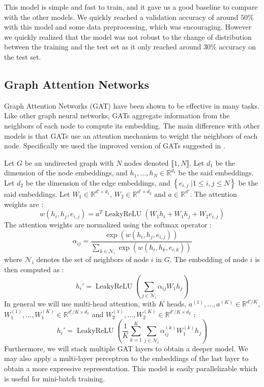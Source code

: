\documentclass[switch, 11pt]{article}
\DeclareMathOperator{\leakyrelu}{LeakyReLU}
\newcommand{\R}{\mathbb{R}}
\begin{document}
\begin{multicols}{2}
    This model is simple and fast to train, and it gave us a good baseline to compare with the other models. We quickly reached a validation accuracy of around $50\%$ with this model and some data preprocessing, which was encouraging. However we quickly realized that the model was not robust to the change of distribution between the training and the test set as it only reached around $30\%$ accuracy on the test set.

    \subsection{Graph Attention Networks}

    Graph Attention Networks (GAT) \cite{velickovic-2018} have been shown to be effective in many tasks. Like other graph neural networks, GATs aggregate information from the neighbors of each node to compute its embedding. The main difference with other models is that GATs use an attention mechanism to weight the neighbors of each node. Specifically we used the improved version of GATs suggested in \cite{brody-2021}.

    Let $G$ be an undirected graph with $N$ nodes denoted $\llbracket1, N\rrbracket$. Let $d_1$ be the dimension of the node embeddings, and $h_1,\dots,h_N\in\R^{d_1}$ be the said embeddings. Let $d_2$ be the dimension of the edge embeddings, and $\left\{e_{i,j} \; | 1\leq i,j\leq N\right\}$ be the said embeddings. Let $W_1\in\R^{d'\times d_1}$, $W_2\in\R^{d'\times d_2}$ and $a\in\R^{d'}$. The attention weights are :
    \begin{equation}
        w(h_i,h_j, e_{i,j}) = a^T \leakyrelu(W_1h_i + W_1h_j + W_2e_{i,j})
    \end{equation}
    The attention weights are normalized using the softmax operator :
    \begin{equation}
        \alpha_{ij} = \frac{\exp(w(h_i,h_j, e_{i,j}))}{\sum_{k\in\mathcal{N}_i}\exp(w(h_i,h_k, e_{i,k}))}
    \end{equation}
    where $\mathcal{N}_i$ denotes the set of neighbors of node $i$ in $G$. The embedding of node $i$ is then computed as :
    \begin{equation}
        h_i' = \leakyrelu\left(\sum_{j\in\mathcal{N}_i}\alpha_{ij}W_1h_j\right)
    \end{equation}
    In general we will use multi-head attention, with $K$ heads, $a^{(1)},\dots,a^{(K)}\in\R^{d'/K}$, $W_1^{(1)},\dots,W_1^{(K)}\in\R^{d'/K\times d_1}$ and $W_2^{(1)},\dots,W_2^{(K)}\in\R^{d'/K\times d_2}$ :
    \begin{equation}
        h_i' = \leakyrelu\left(\frac{1}{K}\sum_{k=1}^K\sum_{j\in\mathcal{N}_i}\alpha_{ij}^{(k)}W_1^{(k)}h_j\right)
    \end{equation}
    Furthermore, we will stack multiple GAT layers to obtain a deeper model. We may also apply a multi-layer perceptron to the embeddings of the last layer to obtain a more expressive representation. This model is easily parallelizable which is useful for mini-batch training.


\end{multicols}
\end{document}
